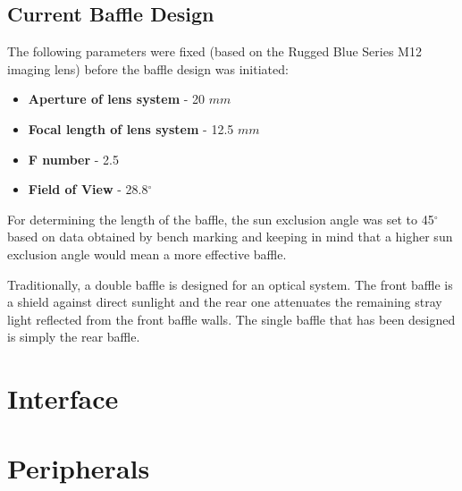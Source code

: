 \subsection{Current Baffle Design}
The following parameters were fixed (based on the Rugged Blue Series M12 imaging lens) before the baffle design was initiated:
\begin{itemize}
    \item \textbf{Aperture of lens system} - 20 $mm$
    \item \textbf{Focal length of lens system} - 12.5 $mm$
    \item \textbf{F number} - 2.5
    \item \textbf{Field of View} - 28.8$^\circ$
\end{itemize}
\par
For determining the length of the baffle, the sun exclusion angle was set to 45$^\circ$ based on data obtained by bench marking and keeping in mind that a higher sun exclusion angle would mean a more effective baffle.
\par
Traditionally, a double baffle is designed for an optical system. The front baffle is a shield against direct sunlight and the rear one attenuates the remaining stray light reflected from the front baffle walls. The single baffle that has been designed is simply the rear baffle. 







\section{Interface}
\section{Peripherals}
\clearpage

